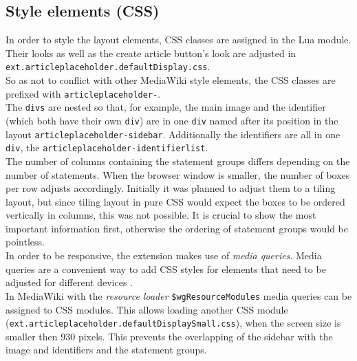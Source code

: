 \subsection{Style elements (CSS)}

In order to style the layout elements, CSS classes are assigned in the Lua module. Their looks as well as the create article button's look are adjusted in \texttt{ext.articleplaceholder.defaultDisplay.css}. \\
So as not to conflict with other MediaWiki style elements, the CSS classes are prefixed with \texttt{\justify articleplaceholder-}. \\
The \texttt{\justify divs} are nested so that, for example, the main image and the identifier (which both have their own \texttt{div}) are in one \texttt{div} named after its position in the layout \texttt{\justify articleplaceholder-sidebar}. Additionally the identifiers are all in one \texttt{div}, the \texttt{\justify articleplaceholder-identifierlist}. \\
The number of columns containing the statement groups differs depending on the number of statements. When the browser window is smaller, the number of boxes per row adjusts accordingly. Initially it was planned to adjust them to a tiling layout, but since tiling layout in pure CSS would expect the boxes to be ordered vertically in columns, this was not possible. It is crucial to show the most important information first, otherwise the ordering of statement groups would be pointless. \\
In order to be responsive, the extension makes use of \textit{media queries}. Media queries are a convenient way to add CSS styles for elements that need to be adjusted for different devices \citep[43]{mediaquery}.\\
In MediaWiki with the \textit{resource loader} \texttt{\justify \$wgResourceModules} media queries can be assigned to CSS modules. This allows loading another CSS module (\texttt{\justify ext.articleplaceholder.defaultDisplaySmall.css}), when the screen size is smaller then 930 pixels. This  prevents the overlapping of the sidebar with the image and identifiers and the statement groups.